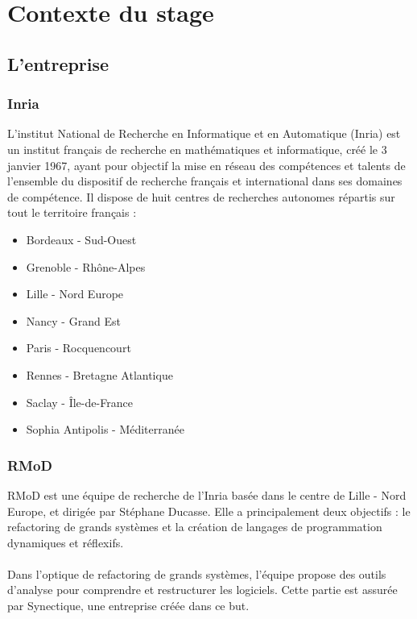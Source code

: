 	\section{Contexte du stage}
	\subsection{L'entreprise}
	\subsubsection{Inria}
	L'institut National de Recherche en Informatique et en Automatique (Inria) est un institut français de recherche en mathématiques et informatique, créé le 3 janvier 1967, ayant pour objectif la mise en réseau des compétences et talents de l'ensemble du dispositif de recherche français et international dans ses domaines de compétence. Il dispose de huit centres de recherches autonomes répartis sur tout le territoire français :
	
	\begin{itemize}
		\item Bordeaux - Sud-Ouest
		\item Grenoble - Rhône-Alpes
		\item Lille - Nord Europe
		\item Nancy - Grand Est
		\item Paris - Rocquencourt
		\item Rennes - Bretagne Atlantique
		\item Saclay - Île-de-France
		\item Sophia Antipolis - Méditerranée
	\end{itemize}

	\subsubsection{RMoD}
	RMoD est une équipe de recherche de l'Inria basée dans le centre de Lille - Nord Europe, et dirigée par Stéphane Ducasse. Elle a principalement deux objectifs : le refactoring de grands systèmes et la création de langages de programmation dynamiques et réflexifs.
	
	\paragraph{}
	Dans l'optique de refactoring de grands systèmes, l'équipe propose des outils d'analyse pour comprendre et restructurer les logiciels. Cette partie est assurée par Synectique, une entreprise créée dans ce but.
	
